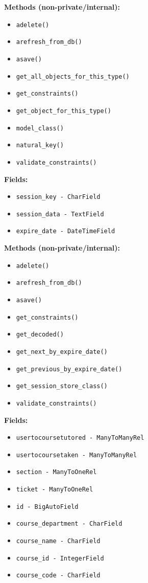 \documentclass[oneside,openany,obeyspaces]{book}
\begin{document}
\begin{flushleft}
    \textbf{Methods (non-private/internal):}
    \begin{itemize}
        \item \texttt{adelete()}
        \item \texttt{arefresh\_from\_db()}
        \item \texttt{asave()}
        \item \texttt{get\_all\_objects\_for\_this\_type()}
        \item \texttt{get\_constraints()}
        \item \texttt{get\_object\_for\_this\_type()}
        \item \texttt{model\_class()}
        \item \texttt{natural\_key()}
        \item \texttt{validate\_constraints()}
    \end{itemize}

    \textbf{Fields:}
    \begin{itemize}
        \item \texttt{session\_key - CharField}
        \item \texttt{session\_data - TextField}
        \item \texttt{expire\_date - DateTimeField}
    \end{itemize}

    \textbf{Methods (non-private/internal):}
    \begin{itemize}
        \item \texttt{adelete()}
        \item \texttt{arefresh\_from\_db()}
        \item \texttt{asave()}
        \item \texttt{get\_constraints()}
        \item \texttt{get\_decoded()}
        \item \texttt{get\_next\_by\_expire\_date()}
        \item \texttt{get\_previous\_by\_expire\_date()}
        \item \texttt{get\_session\_store\_class()}
        \item \texttt{validate\_constraints()}
    \end{itemize}

    \textbf{Fields:}
    \begin{itemize}
        \item \texttt{usertocoursetutored - ManyToManyRel}
        \item \texttt{usertocoursetaken - ManyToManyRel}
        \item \texttt{section - ManyToOneRel}
        \item \texttt{ticket - ManyToOneRel}
        \item \texttt{id - BigAutoField}
        \item \texttt{course\_department - CharField}
        \item \texttt{course\_name - CharField}
        \item \texttt{course\_id - IntegerField}
        \item \texttt{course\_code - CharField}
    \end{itemize}


\end{flushleft}
\end{document}
